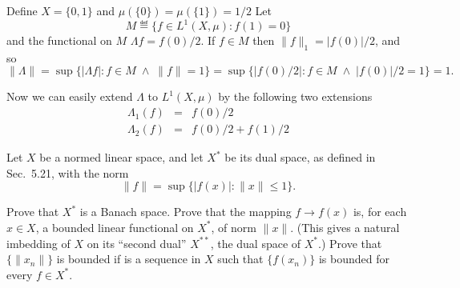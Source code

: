 \begin{enumerate}
Define \(X=\{0,1\}\) and \(\mu(\{0\}) = \mu(\{1\}) = 1/2\)
Let
\[ M \eqdef \{f\in L^1(X,\mu): f(1) = 0\}\]
and the functional on $M$  \(\Lambda f = f(0)/2\).
If \(f\in M\) then \(\|f\|_1 = |f(0)|/2\), and so
\[ \|\Lambda\|
= \sup \{|\Lambda f|: f \in M\;\wedge\;\|f\|=1\}
= \sup \{|f(0)/2|: f \in M\;\wedge\;|f(0)|/2=1\}
= 1. \]

Now we can easily extend \(\Lambda\) to \(L^1(X,\mu)\)
by the following two extensions
\begin{eqnarray*}
\Lambda_1(f) &=& f(0)/2 \\
\Lambda_2(f) &=& f(0)/2 + f(1)/2
\end{eqnarray*}


\begin{excopy}
Let $X$ be a normed linear space, and let \(X^*\) be its dual space, as defined
in Sec.~5.21, with the norm
\[\|f\| = \sup \{|f(x)|: \|x\|\leq 1\}.\]
\begin{itemize}
  Prove that \(X^*\) is a Banach space.
 Prove that the mapping \(f\to f(x)\) is, for each \(x\in X\),
 a bounded linear functional on \(X^*\), of norm \(\|x\|\).
 (This gives a natural imbedding of $X$ on its ``second dual'' \(X^{**}\),
 the dual space of \(X^*\).)
  Prove that \(\{\|x_n\|\}\) is bounded if  is a sequence
 in $X$ such that \(\{f(x_n)\}\) is bounded for every \(f\in X^*\).
\end{itemize}
\end{excopy}


\end{enumerate}
